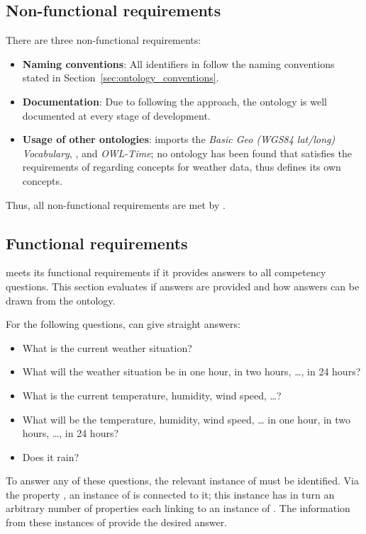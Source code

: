 \subsection{Non-functional requirements}
\label{sec:evaluation_non_functional}

There are three non-functional requirements:

\begin{itemize}
  \item \textbf{Naming conventions}: All identifiers in \smarthomeweather follow the naming conventions stated in Section~\ref{sec:ontology_conventions}.
  \item \textbf{Documentation}: Due to following the \methontology approach, the ontology is well documented at every stage of development.
  \item \textbf{Usage of other ontologies}: \smarthomeweather imports the \emph{Basic Geo (WGS84 lat/long) Vocabulary}, \muo, and \emph{OWL-Time}; no ontology has been found that satisfies the requirements of \smarthomeweather regarding concepts for weather data, thus \smarthomeweather defines its own concepts.
\end{itemize}

Thus, all non-functional requirements are met by \smarthomeweather.

\subsection{Functional requirements}
\label{sec:evaluation_functional}

\smarthomeweather meets its functional requirements if it provides answers to all competency questions. This section evaluates if answers are provided and how answers can be drawn from the ontology.

For the following questions, \smarthomeweather can give straight answers:
\begin{itemize}
  \item What is the current weather situation?
  \item What will the weather situation be in one hour, in two hours, …, in 24 hours?
  \item What is the current temperature, humidity, wind speed, …?
  \item What will be the temperature, humidity, wind speed, … in one hour, in two hours, …, in 24 hours?
  \item Does it rain?
\end{itemize}
To answer any of these questions, the relevant instance of  must be identified. Via the property , an instance of  is connected to it; this instance has in turn an arbitrary number of  properties each linking to an instance of . The information from these instances of  provide the desired answer.

